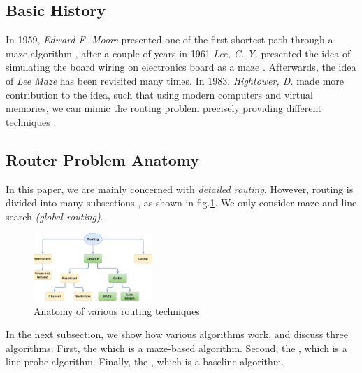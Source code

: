 \subsection{Basic History}
    In 1959, \emph{Edward F. Moore} presented one of the first shortest path through a maze algorithm
    \cite{MooreRef}, after a couple of years in 1961 \emph{Lee, C. Y.} presented the idea of simulating the 
    board wiring on electronics board as a maze \cite{LeeRef}. Afterwards, the idea of \emph{Lee Maze}
    has been revisited many times. In 1983, \emph{Hightower, D.} made more contribution to the idea, such that
    using modern computers and virtual memories, we can mimic the routing problem precisely providing 
    different techniques \cite{HightowerRef}.

\subsection{Router Problem Anatomy}
    In this paper, we are mainly concerned with \emph{detailed routing}. However, routing is divided into many subsections \cite{routingBook}, as shown in fig.\ref{fig:routing_anat}. We only consider maze and line search \emph{(global routing)}.

    \begin{figure}
        \centering
        \includegraphics[width=0.4\textwidth]{figures/routing_anatomy.png}
        \caption{Anatomy of various routing techniques}
        \label{fig:routing_anat}
    \end{figure}

    In the next subsection, we show how various algorithms work, and discuss three 
    algorithms. First, the  which is a maze-based algorithm. Second, the 
    , which is a line-probe algorithm. Finally, the ,
    which is a baseline algorithm.

